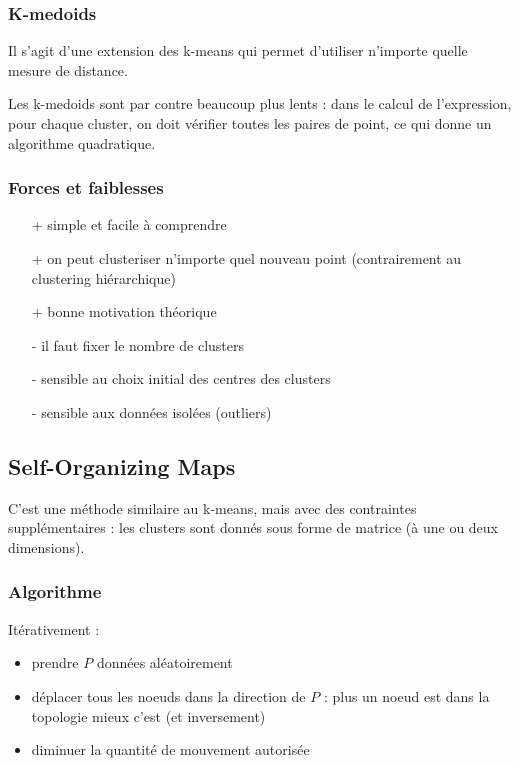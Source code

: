 		\subsubsection{K-medoids}
		
		Il s'agit d'une extension des k-means qui permet d'utiliser n'importe quelle mesure de distance. 
		
		
		Les k-medoids sont par contre beaucoup plus lents : dans le calcul de l'expression, pour chaque cluster, on doit vérifier toutes les paires de point, ce qui donne un algorithme quadratique.
		
		\subsubsection{Forces et faiblesses}
		
		\begin{itemize}
			\item[+] simple et facile à comprendre
			\item[+] on peut clusteriser n'importe quel nouveau point (contrairement au clustering hiérarchique)
			\item[+] bonne motivation théorique
			\item[-] il faut fixer le nombre de clusters
			\item[-] sensible au choix initial des centres des clusters
			\item[-] sensible aux données isolées (outliers)
		\end{itemize}
	
	\subsection{Self-Organizing Maps}
	
	C'est une méthode similaire au k-means, mais avec des contraintes supplémentaires : les clusters sont donnés sous forme de matrice (à une ou deux dimensions).
	
	
		\subsubsection{Algorithme}
		
		Itérativement :
		\begin{itemize}
			\item prendre $P$ données aléatoirement		
			\item déplacer tous les noeuds dans la direction de $P$ : plus un noeud est dans la topologie mieux c'est (et inversement)
			\item diminuer la quantité de mouvement autorisée
		\end{itemize}
		
